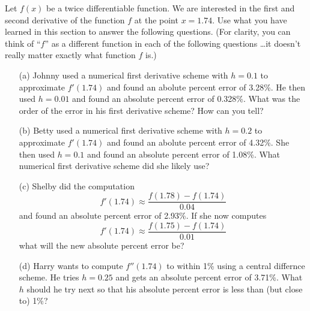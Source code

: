 \begin{problem}
    Let $f(x)$ be a twice differentiable function.  We are interested in the first and
    second derivative of the function $f$ at the point $x = 1.74$.  Use what you have
    learned in this section to answer the following questions. (For clarity, you can think
    of ``$f$'' as a different function in each of the following questions \ldots it
    doesn't really matter exactly what function $f$ is.)
    \begin{enumerate}
        \item[(a)] Johnny used a numerical first derivative scheme with $h = 0.1$ to
            approximate $f'(1.74)$ and found an abolute percent error of 3.28\%.  He then
            used $h=0.01$ and found an absolute percent error of 0.328\%.  What was the
            order of the error in his first derivative scheme? How can you tell?
        \item[(b)] Betty used a numerical first derivative scheme with $h = 0.2$ to
            approximate $f'(1.74)$ and found an abolute percent error of 4.32\%.  She then used
            $h=0.1$ and found an absolute percent error of 1.08\%.  What numerical first
            derivative scheme did she likely use?
        \item[(c)] Shelby did the computation 
            \[ f'(1.74) \approx \frac{f(1.78) - f(1.74)}{0.04} \]
            and found an absolute percent error of 2.93\%.  If she now computes 
            \[ f'(1.74) \approx \frac{f(1.75) - f(1.74)}{0.01} \]
            what will the new absolute percent error be?
        \item[(d)] Harry wants to compute $f''(1.74)$ to within 1\% using a central
            differnce scheme.  He tries $h=0.25$
            and gets an absolute percent error of 3.71\%.  What $h$ should he try next so
            that his absolute percent error is less than (but close to) 1\%?
    \end{enumerate}
\end{problem}






